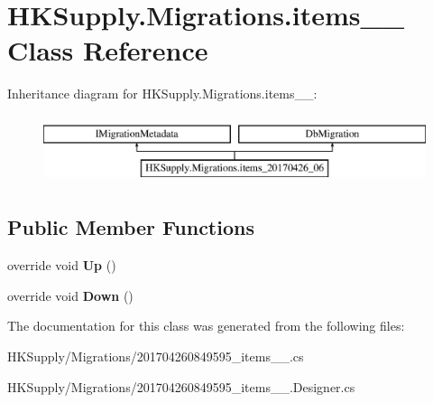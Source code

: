\hypertarget{class_h_k_supply_1_1_migrations_1_1items__20170426__06}{}\section{H\+K\+Supply.\+Migrations.\+items\+\_\+\_ Class Reference}
\label{class_h_k_supply_1_1_migrations_1_1items__20170426__06}
Inheritance diagram for H\+K\+Supply.\+Migrations.\+items\+\_\+\_\+:\begin{figure}[H]
\begin{center}
\leavevmode
\includegraphics[height=2.000000cm]{class_h_k_supply_1_1_migrations_1_1items__20170426__06}
\end{center}
\end{figure}
\subsection*{Public Member Functions}
\begin{DoxyCompactItemize}
\item 
\mbox{\label{class_h_k_supply_1_1_migrations_1_1items__20170426__06_a7b7520f8a31d1cdd7ed5f59deed03a54}} 
override void {\bfseries Up} ()
\item 
\mbox{\label{class_h_k_supply_1_1_migrations_1_1items__20170426__06_a84a3ff8d6f1762ed620861833272c810}} 
override void {\bfseries Down} ()
\end{DoxyCompactItemize}


The documentation for this class was generated from the following files\+:\begin{DoxyCompactItemize}
\item 
H\+K\+Supply/\+Migrations/201704260849595\+\_\+items\+\_\+\_.\+cs\item 
H\+K\+Supply/\+Migrations/201704260849595\+\_\+items\+\_\+\_.\+Designer.\+cs\end{DoxyCompactItemize}
